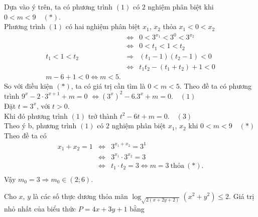 \begin{ex}
{\begin{itemchoice}
			 \itemch
			Dựa vào ý trên, ta có  phương trình $(1)$ có $2$ nghiệm phân biệt khi $0< m < 9\quad (*)$.\\
			Phương trình $(1)$ có hai nghiệm  phân biệt $x_1$, $x_2$ thỏa $x_1 < 0< x_2$
			\begin{eqnarray*}
				 &\Leftrightarrow & 0< 3^{x_1} < 3^0< 3^{x_2}\\
				&\Leftrightarrow & 0< t_1 < 1<  t_2\\
				t_1  < 1< t_2 &\Rightarrow & \left(t_1-1\right)\left(t_2-1\right) < 0\\
				&\Leftrightarrow & t_1 t_2-\left(t_1+t_2  \right)+1< 0\\
				m-6+1< 0\Leftrightarrow  m < 5.
			\end{eqnarray*}
			So với điều kiện $(*)$, ta có giá trị cần tìm là $0<  m < 5$.
			\itemch 
			Theo  đề ta có phương trình $9^x-2\cdot 3^{x+1}+m=0$ $\Leftrightarrow \left(3^x \right)^2-6.3^x+m=0.\quad(1)$ \\
			Đặt $t=3^x$, với $t >  0$.\\
			Khi đó phương trình $(1)$ trở thành  $t^2-6t+m=0.\quad(3)$\\
			Theo ý b, phương trình $(1)$ có $2$ nghiệm phân biệt $x_1$, $x_2$ khi  $0< m < 9\quad(*)$\\
			Theo đề  ta có
			\begin{eqnarray*}
				x_1+x_2=1 &\Leftrightarrow  &3^{x_1+x_2}=3^1\\
				&\Leftrightarrow & 3^{x_1}\cdot 3^{x_2}=3\\ 
				&\Leftrightarrow & t_1\cdot t_2=3\Leftrightarrow m=3~ \text{thỏa}~  (*).\\
			\end{eqnarray*}
			Vậy  $m_0=3\Rightarrow m_0 \in (2;6)$.
		\end{itemchoice}
	 }
\end{ex}

\begin{ex}%
	Cho $x$, $y$ là các số thực dương thỏa mãn $\log_{\sqrt{2(x+2y+2)}}\left(x^2+y^2\right)\leq 2$. Giá trị nhỏ nhất  của biểu thức $P=4x+3y+1$ bằng
\end{ex}

